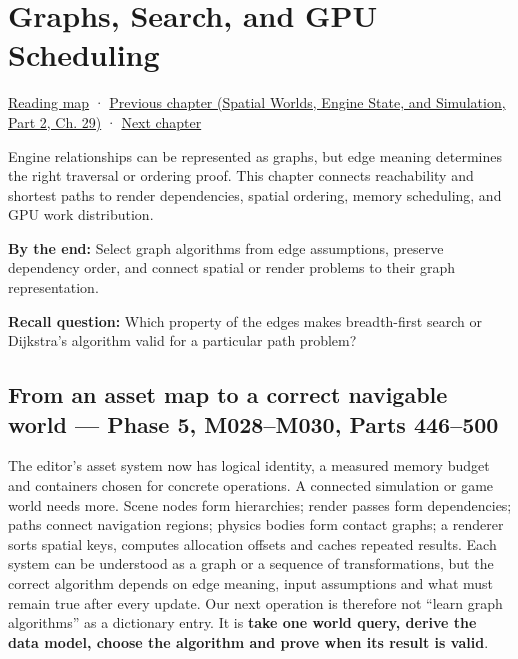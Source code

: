 \chapter{Graphs, Search, and GPU Scheduling}\label{01-foundations-i-ch008-graphs-search-and-gpu-scheduling}\hypertarget{01-foundations-i-ch008}{}\label{stagechapter:01-foundations-i-ch008}

\hypertarget{01-foundations-i-ch008-graphs-search-and-gpu-scheduling}{}

\hyperref[volume-reading-map]{Reading map} · \href{../05-Spatial-Worlds-Engine-State-and-Simulation-P02/main.pdf\#06-engine-ii-ch040}{Previous chapter (Spatial Worlds, Engine State, and Simulation, Part 2, Ch. 29)} · \hyperref[01-foundations-i-ch009-gpu-memory-divergence-atomics-and-ordering]{Next chapter}

Engine relationships can be represented as graphs, but edge meaning determines the right traversal or ordering proof. This chapter connects reachability and shortest paths to render dependencies, spatial ordering, memory scheduling, and GPU work distribution.

\textbf{By the end:} Select graph algorithms from edge assumptions, preserve dependency order, and connect spatial or render problems to their graph representation.

\textbf{Recall question:} Which property of the edges makes breadth-first search or Dijkstra's algorithm valid for a particular path problem?

\section{From an asset map to a correct navigable world --- Phase 5, M028--M030, Parts 446--500}\label{01-foundations-i-ch008-from-an-asset-map-to-a-correct-navigable-world-phase-5-m028m030-parts-446500}

\hypertarget{01-foundations-i-ch008-from-an-asset-map-to-a-correct-navigable-world-phase-5-m028m030-parts-446500}{}

The editor's asset system now has logical identity, a measured memory budget and containers chosen for concrete operations. A connected simulation or game world needs more. Scene nodes form hierarchies; render passes form dependencies; paths connect navigation regions; physics bodies form contact graphs; a renderer sorts spatial keys, computes allocation offsets and caches repeated results. Each system can be understood as a graph or a sequence of transformations, but the correct algorithm depends on edge meaning, input assumptions and what must remain true after every update. Our next operation is therefore not ``learn graph algorithms'' as a dictionary entry. It is \textbf{take one world query, derive the data model, choose the algorithm and prove when its result is valid}.

